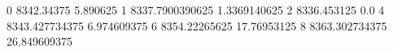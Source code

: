 0 8342.34375 5.890625
1 8337.7900390625 1.3369140625
2 8336.453125 0.0
4 8343.427734375 6.974609375
6 8354.22265625 17.76953125
8 8363.302734375 26.849609375
